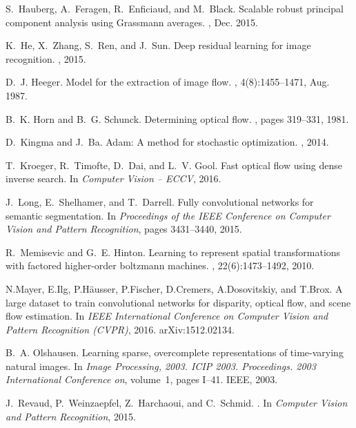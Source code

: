 \documentclass[10pt,twocolumn,letterpaper]{article}
\begin{document}
\begin{thebibliography}{10}
S.~Hauberg, A.~Feragen, R.~Enficiaud, and M.~Black.
\newblock Scalable robust principal component analysis using {Grassmann}
  averages.
,
  Dec. 2015.

K.~He, X.~Zhang, S.~Ren, and J.~Sun.
\newblock Deep residual learning for image recognition.
, 2015.

D.~J. Heeger.
\newblock Model for the extraction of image flow.
, 4(8):1455--1471, Aug. 1987.

B.~K. Horn and B.~G. Schunck.
\newblock Determining optical flow.
, pages 319--331, 1981.

D.~Kingma and J.~Ba.
\newblock Adam: A method for stochastic optimization.
, 2014.

T.~Kroeger, R.~Timofte, D.~Dai, and L.~V. Gool.
\newblock Fast optical flow using dense inverse search.
\newblock In {\em Computer Vision -- ECCV}, 2016.

J.~Long, E.~Shelhamer, and T.~Darrell.
\newblock Fully convolutional networks for semantic segmentation.
\newblock In {\em Proceedings of the IEEE Conference on Computer Vision and
  Pattern Recognition}, pages 3431--3440, 2015.

R.~Memisevic and G.~E. Hinton.
\newblock Learning to represent spatial transformations with factored
  higher-order boltzmann machines.
, 22(6):1473--1492, 2010.

N.Mayer, E.Ilg, P.H{\"a}usser, P.Fischer, D.Cremers, A.Dosovitskiy, and T.Brox.
\newblock A large dataset to train convolutional networks for disparity,
  optical flow, and scene flow estimation.
\newblock In {\em IEEE International Conference on Computer Vision and Pattern
  Recognition (CVPR)}, 2016.
\newblock arXiv:1512.02134.

B.~A. Olshausen.
\newblock Learning sparse, overcomplete representations of time-varying natural
  images.
\newblock In {\em Image Processing, 2003. ICIP 2003. Proceedings. 2003
  International Conference on}, volume~1, pages I--41. IEEE, 2003.

J.~Revaud, P.~Weinzaepfel, Z.~Harchaoui, and C.~Schmid.
.
\newblock In {\em {Computer Vision and Pattern Recognition}}, 2015.


\end{thebibliography}
\end{document}
